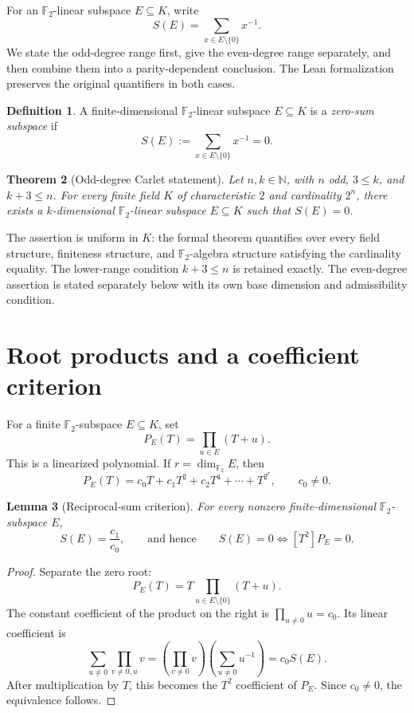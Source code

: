\documentclass[11pt]{amsart}
\numberwithin{equation}{section}
\newtheorem{theorem}{Theorem}[section]
\newtheorem{lemma}[theorem]{Lemma}
\theoremstyle{definition}
\newtheorem{definition}[theorem]{Definition}
\theoremstyle{remark}
\newcommand{\Ftwo}{\mathbb F_2}
\newcommand{\dimf}{\dim_{\Ftwo}}
\begin{document}
For an $\Ftwo$-linear subspace $E\subseteq K$, write
\[
 S(E)=\sum_{x\in E\setminus\{0\}}x^{-1}.
\]
We state the odd-degree range first, give the even-degree range separately, and then combine them into a parity-dependent conclusion. The Lean formalization preserves the original quantifiers in both cases.

\begin{definition}
A finite-dimensional $\Ftwo$-linear subspace $E\subseteq K$ is a \emph{zero-sum subspace} if
\[
 S(E):=\sum_{x\in E\setminus\{0\}}x^{-1}=0.
\]
\end{definition}

\begin{theorem}[Odd-degree Carlet statement]\label{thm:main}
Let $n,k\in\mathbb N$, with $n$ odd, $3\le k$, and $k+3\le n$. For every finite field $K$ of characteristic $2$ and cardinality $2^n$, there exists a $k$-dimensional $\Ftwo$-linear subspace $E\subseteq K$ such that $S(E)=0$.
\end{theorem}

The assertion is uniform in $K$: the formal theorem quantifies over every field structure, finiteness structure, and $\Ftwo$-algebra structure satisfying the cardinality equality. The lower-range condition $k+3\le n$ is retained exactly. The even-degree assertion is stated separately below with its own base dimension and admissibility condition.

\section{Root products and a coefficient criterion}

For a finite $\Ftwo$-subspace $E\subseteq K$, set
\[
 P_E(T)=\prod_{u\in E}(T+u).
\]
This is a linearized polynomial. If $r=\dimf E$, then
\[
 P_E(T)=c_0T+c_1T^2+c_2T^4+\cdots+T^{2^r},\qquad c_0\ne0.
\]

\begin{lemma}[Reciprocal-sum criterion]\label{lem:coeff}
For every nonzero finite-dimensional $\Ftwo$-subspace $E$,
\[
 S(E)=\frac{c_1}{c_0},\qquad\text{and hence}\qquad
 S(E)=0\Longleftrightarrow [T^2]P_E=0.
\]
\end{lemma}
\begin{proof}
Separate the zero root:
\[
 P_E(T)=T\prod_{u\in E\setminus\{0\}}(T+u).
\]
The constant coefficient of the product on the right is $\prod_{u\ne0}u=c_0$. Its linear coefficient is
\[
 \sum_{u\ne0}\prod_{v\ne0,u}v
 =\left(\prod_{v\ne0}v\right)\left(\sum_{u\ne0}u^{-1}\right)=c_0S(E).
\]
After multiplication by $T$, this becomes the $T^2$ coefficient of $P_E$. Since $c_0\ne0$, the equivalence follows.
\end{proof}
\end{document}
